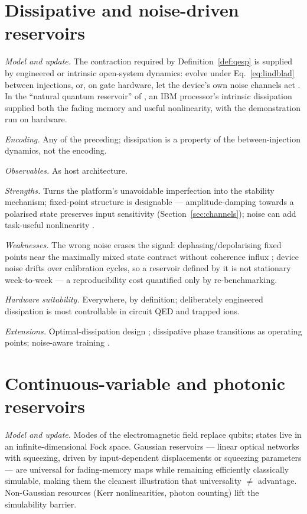 \section{Dissipative and noise-driven reservoirs}
\label{sec:arch-dissipative}

\emph{Model and update.} The contraction required by
Definition~\ref{def:qesp} is supplied by engineered or intrinsic open-system
dynamics: evolve under Eq.~\eqref{eq:lindblad} between injections, or, on
gate hardware, let the device's own noise channels act
\citep{chen2019learning,sannia2024dissipation}. In the ``natural quantum
reservoir'' of \citet{suzuki2022natural}, an IBM processor's intrinsic
dissipation supplied both the fading memory and useful nonlinearity, with the
demonstration run on hardware.

\emph{Encoding.} Any of the preceding; dissipation is a property of the
between-injection dynamics, not the encoding.

\emph{Observables.} As host architecture.

\emph{Strengths.} Turns the platform's unavoidable imperfection into the
stability mechanism; fixed-point structure is designable --- amplitude-damping
towards a polarised state preserves input sensitivity
(Section~\ref{sec:channels}); noise can add task-useful nonlinearity
\citep{fry2023optimizing,domingo2022optimal}.

\emph{Weaknesses.} The wrong noise erases the signal: dephasing/depolarising
fixed points near the maximally mixed state contract without coherence influx
\citep{kobayashi2024coherence,xiong2025role}; device noise drifts over
calibration cycles, so a reservoir defined by it is not stationary
week-to-week --- a reproducibility cost quantified only by re-benchmarking.

\emph{Hardware suitability.} Everywhere, by definition; deliberately
engineered dissipation is most controllable in circuit QED and trapped ions.

\emph{Extensions.} Optimal-dissipation design \citep{sannia2024dissipation};
dissipative phase transitions as operating points; noise-aware training
\citep{ahmed2025optimal}.

\section{Continuous-variable and photonic reservoirs}
\label{sec:arch-cv}

\emph{Model and update.} Modes of the electromagnetic field replace qubits;
states live in an infinite-dimensional Fock space. Gaussian reservoirs ---
linear optical networks with squeezing, driven by input-dependent
displacements or squeezing parameters --- are universal for fading-memory maps
\citep{nokkala2021gaussian} while remaining efficiently classically
simulable, making them the cleanest illustration that universality
$\ne$ advantage. Non-Gaussian resources (Kerr nonlinearities, photon
counting) lift the simulability barrier.

